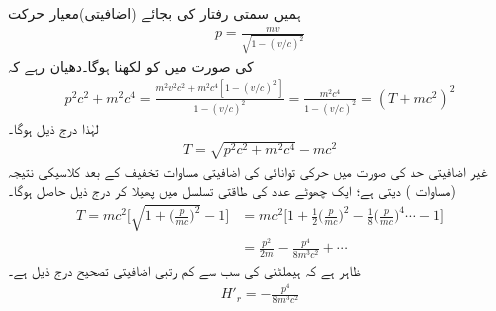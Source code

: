  ہمیں سمتی رفتار کی بجائے (اضافیتی)معیار حرکت
\begin{align}\label{مساوات_غیر_مضطرب_اضافیتی_معیار_حرکت}
p = \frac{mv}{\sqrt{1 - (v/c)^2}}
\end{align}
 کی صورت میں  کو لکھنا ہوگا۔دھیان رہے کہ
\begin{align*}
p^2 c^2 + m^2 c^4 = \frac{m^2 v^2 c^2 + m^2 c^4 [1 - (v/c)^2]}{1 - (v/c)^2} = \frac{m^2 c^4}{1 - (v/c)^2} = (T + mc^2)^2
\end{align*}
لہٰذا درج ذیل ہوگا۔
\begin{align}
T = \sqrt{p^2 c^2 + m^2 c^4} - mc^2
\end{align}
غیر اضافیتی حد  کی صورت میں حرکی توانائی کی اضافیتی مساوات تخفیف کے بعد کلاسیکی نتیجہ (مساوات ) دیتی ہے؛ ایک چھوٹے 
 عدد  کی طاقتی تسلسل میں پھیلا کر درج ذیل حاصل ہوگا۔
\begin{align}\label{مساوات_غیر_مضطرب_ٹی}
T = mc^2 \big [ \sqrt{1 + \big(\frac{p}{mc}\big)^2} - 1 \big ] &= mc^2 \big [ 1 + \frac{1}{2} \big(\frac{p}{mc}\big)^2 - \frac{1}{8} \big(\frac{p}{mc}\big)^4 \cdots - 1 \big ] \nonumber \\
&= \frac{p^2}{2m} - \frac{p^4}{8m^3 c^2} + \cdots 
\end{align}
ظاہر ہے کہ ہیملٹنی کی سب سے کم رتبی اضافیتی تصحیح درج ذیل ہے۔
\begin{align}\label{مساوات_غیر_مضطرب_سب_سے_کم_اضطراب}
H'_r = - \frac{p^4}{8m^3 c^2}
\end{align}

